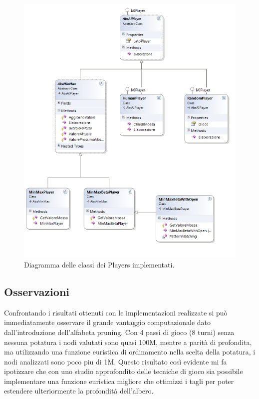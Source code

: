 \documentclass[paper=a4, fontsize=11pt]{scrartcl}	%
\numberwithin{equation}{section}															%
\numberwithin{figure}{section}																%
\numberwithin{table}{section}																%
\begin{document}
\begin{figure}[h]
\centering
        \includegraphics[totalheight=18cm]{Iplayer.png}
    \caption{Diagramma delle classi dei Players implementati.}
    \label{fig:verticalcell}
\end{figure}

\subsection{Osservazioni}
Confrontando i risultati ottenuti con le implementazioni realizzate si pu\`o immediatamente osservare il grande vantaggio computazionale dato dall'introduzione dell'alfabeta pruning. Con 4 passi di gioco (8 turni) senza nessuna potatura i nodi valutati sono quasi 100M, mentre a parit\`a di profondita, ma utilizzando una funzione euristica di ordinamento nella scelta della potatura, i nodi analizzati sono poco piu di 1M. Questo risultato cos\`i evidente mi fa ipotizzare che con uno studio approfondito delle tecniche di gioco sia possibile implementare una funzione euristica migliore che ottimizzi i tagli per poter estendere ulteriormente la profondit\`a dell'albero.
\end{document}
